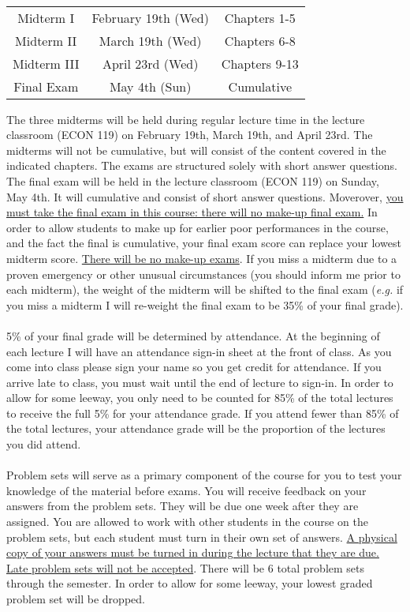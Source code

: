 \documentclass[11pt]{article}
\begin{document}
\\\begin{center}
\begin{tabular}{ccc}
    Midterm I & February 19th (Wed) & Chapters 1-5 \\
    Midterm II & March 19th (Wed) & Chapters 6-8 \\
   	Midterm III & April 23rd (Wed) & Chapters 9-13 \\
    Final Exam & May 4th (Sun) & Cumulative \\
\end{tabular}
\end{center}
The three midterms will be held during regular lecture time in the lecture classroom (ECON 119) on February 19th, March 19th, and April 23rd.  The midterms will not be cumulative, but will consist of the content covered in the indicated chapters.  The exams are structured solely with short answer questions.  The final exam will be held in the lecture classroom (ECON 119) on Sunday, May 4th.  It will cumulative and consist of short answer questions.  Moverover, \uline{you must take the final exam in this course: there will no make-up final exam.}  In order to allow students to make up for earlier poor performances in the course, and the fact the final is cumulative, your final exam score can replace your lowest midterm score.  \uline{There will be no make-up exams}.  If you miss a midterm due to a proven emergency or other unusual circumstances (you should inform me prior to each midterm), the weight of the midterm will be shifted to the final exam (\emph{e.g.} if you miss a midterm I will re-weight the final exam to be 35\% of your final grade).   \\

\newpage
{}\\
5\% of your final grade will be determined by attendance.  At the beginning of each lecture I will have an attendance sign-in sheet at the front of class.  As you come into class please sign your name so you get credit for attendance.  If you arrive late to class, you must wait until the end of lecture to sign-in.  In order to allow for some leeway, you only need to be counted for 85\% of the total lectures to receive the full 5\% for your attendance grade.  If you attend fewer than 85\% of the total lectures, your attendance grade will be the proportion of the lectures you did attend.\\

\\
Problem sets will serve as a primary component of the course for you to test your knowledge of the material before exams.  You will receive feedback on your answers from the problem sets.  They will be due one week after they are assigned.  You are allowed to work with other students in the course on the problem sets, but each student must turn in their own set of answers.  \uline{A physical copy of your answers must be turned in during the lecture that they are due.  Late problem sets will not be accepted}.  There will be 6 total problem sets through the semester.  In order to allow for some leeway, your lowest graded problem set will be dropped.\\ 
\end{document}
